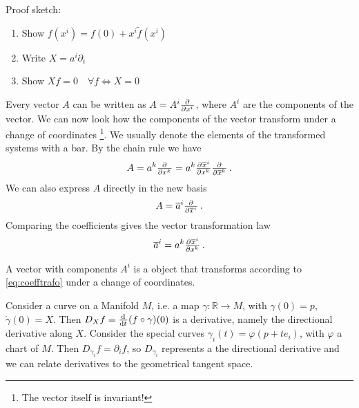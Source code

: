 Proof sketch:
\begin{enumerate}
    \item Show $f(x^i)=f(0)+x^i\tilde{f}(x^i)$
    \item Write $X=a^i\partial_i$
    \item Show $Xf=0\quad \forall f \iff X=0$
\end{enumerate}
Every vector $A$ can be written as $A=A^i\pd{}{{x^i}}$, where $A^i$ are the
components of the vector. We can now look how the components of the vector
transform under a change of coordinates \footnote{The vector itself is
invariant!}.
We usually denote the elements of the transformed systems with a bar.
By the chain rule we have
\begin{equation}
    A= a^k\pd{}{{x^k}}= a^k\pd{\overline{x}^i}{{x^k}}\pd{}{{\overline{x}^k}}\, .
\end{equation}
We can also express $A$ directly in the new basis
\begin{equation}
    A= \overline{a}^i\pd{}{{\overline{x}^i}}\, .
\end{equation}
Comparing the coefficients gives the vector transformation law
\begin{equation}
    \overline{a}^i=a^k\pd{\overline{x}^i}{{x^k}}\label{eq:coefftrafo}\, .
\end{equation}
\begin{definition} A vector with components $A^i$ is a object that transforms according
to \ref{eq:coefftrafo} under a change of coordinates.
\end{definition}
Consider a curve on a Manifold $M$, i.e. a
map $\gamma:\mathbb{R}\to M$, with $\gamma(0)=p$, $\dot{\gamma}(0)=X$. Then $D_X f=\od{}{t}(f\circ\gamma)(0)$ is
a derivative, namely the directional derivative along $X$.
Consider the special curves $\gamma_i(t)=\varphi(p+te_i)$, with $\varphi$ a
chart of $M$. Then $D_{\dot{\gamma}_i} f=\partial_if$,  so $D_{\dot{\gamma}_i}$
represents a the directional derivative and we can relate derivatives to the
geometrical tangent space.

